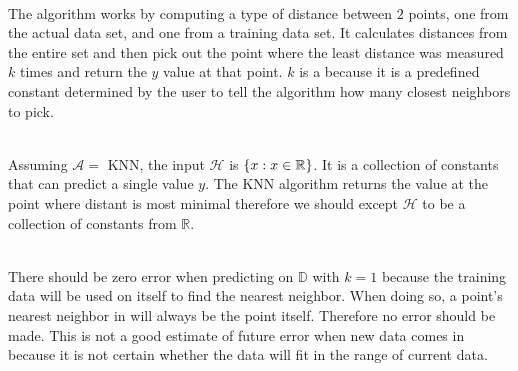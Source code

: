 \documentclass[12pt]{article}
\begin{document}

\begin{enumerate}

 \\ The algorithm works by computing a type of distance between $2$ points, one from the actual data set, and one from a training data set. It calculates distances from the entire set and then pick out the point where the least distance was measured $k$ times and return the $y$ value at that point. $k$ is a  because it is a predefined constant determined by the user to tell the algorithm how many closest neighbors to pick. 

 \\
Assuming $\mathcal{A} = $ KNN, the input $\mathcal{H}$ is $\left\{x: x \in \mathbb{R}\right\}$. It is a collection of constants that can predict a single value $y$. The KNN algorithm returns the value at the point where distant is most minimal therefore we should except $\mathcal{H}$ to be a collection of constants from $\mathbb{R}$. 

 \\
There should be zero error when predicting on $\mathbb{D}$ with $k=1$ because the training data will be used on itself to find the nearest neighbor. When doing so, a point's nearest neighbor in will always be the point itself. Therefore no error should be made. This is not a good estimate of future error when new data comes in because it is not certain whether the data will fit in the range of current data. 

\end{enumerate} 

\end{document}
